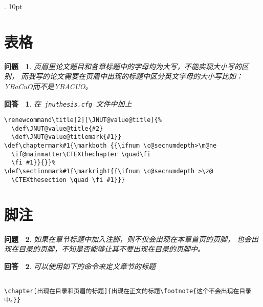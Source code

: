 \documentclass[pdftex, twoside, bachelor]{JNUthesis}
\begin{document}
\begin{spacing}{1.25}
  {}%
  {}%
  {\rm}%
  {}%
  {\bfseries}%
  {.}%
  {10pt}%
  {}%

\theoremstyle{question}
 \newtheorem{FAQ}{问题~}
\theoremstyle{answer}
 \newtheorem{ANS}{回答~}

\section{表格}

\begin{FAQ}
页眉里论文题目和各章标题中的字母均为大写，不能实现大小写的区别，
而我写的论文需要在页眉中出现的标题中区分英文字母的大小写比如：
YBaCuO而不是YBACUO。
\end{FAQ}

\begin{ANS}
在~\texttt{jnuthesis.cfg}~文件中加上
\begin{verbatim}
\renewcommand\title[2][\JNUT@value@title]{%
  \def\JNUT@value@title{#2}
  \def\JNUT@value@titlemark{#1}}
\def\chaptermark#1{\markboth {{\ifnum \c@secnumdepth>\m@ne
  \if@mainmatter\CTEXthechapter \quad\fi
  \fi #1}}{}}%
\def\sectionmark#1{\markright{{\ifnum \c@secnumdepth >\z@
  \CTEXthesection \quad \fi #1}}}
\end{verbatim}
\end{ANS}


\section{脚注}

\begin{FAQ}
如果在章节标题中加入注脚，则不仅会出现在本章首页的页脚，
也会出现在目录的页脚，不知是否能够让其不要出现在目录的页脚中。
\end{FAQ}

\begin{ANS}
可以使用如下的命令来定义章节的标题

\begin{verbatim}

\chapter[出现在目录和页眉的标题]{出现在正文的标题\footnote{这个不会出现在目录中。}}


\end{verbatim}
\end{ANS}
\end{spacing}
\end{document}
